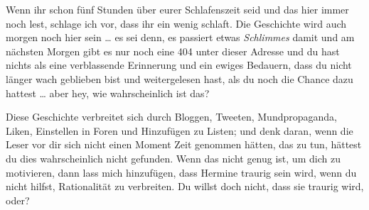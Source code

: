 \begin{chapterOpeningAuthorNote}
Wenn ihr schon fünf Stunden über eurer Schlafenszeit seid und das hier immer noch lest, schlage ich vor, dass ihr ein wenig schlaft. Die Geschichte wird auch morgen noch hier sein … es sei denn, es passiert etwas \emph{Schlimmes} damit und am nächsten Morgen gibt es nur noch eine 404 unter dieser Adresse und du hast nichts als eine verblassende Erinnerung und ein ewiges Bedauern, dass du nicht länger wach geblieben bist und weitergelesen hast, als du noch die Chance dazu hattest … aber hey, wie wahrscheinlich ist das?

Diese Geschichte verbreitet sich durch Bloggen, Tweeten, Mundpropaganda, Liken, Einstellen in Foren und Hinzufügen zu Listen; und denk daran, wenn die Leser vor dir sich nicht einen Moment Zeit genommen hätten, das zu tun, hättest du dies wahrscheinlich nicht gefunden. Wenn das nicht genug ist, um dich zu motivieren, dann lass mich hinzufügen, dass Hermine traurig sein wird, wenn du nicht hilfst, Rationalität zu verbreiten. Du willst doch nicht, dass sie traurig wird, oder?


\end{chapterOpeningAuthorNote}
